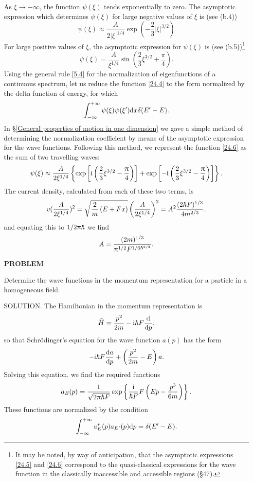 As $ \xi\to-\infty $, the function $ \psi(\xi) $ tends exponentially to zero. The asymptotic expression which determines $ \psi(\xi) $ for large negative values of $\xi$ is (see (b.4))
\begin{equation}\label{24.5}
\psi(\xi)\approx\frac{A}{2|\xi|^{1/4}}\exp\left(-\frac{2}{3}|\xi|^{3/2}\right)
\end{equation}
For large positive values of $\xi$, the asymptotic expression for $ \psi(\xi) $ is (see (b.5))\footnote{It may be noted, by way of anticipation, that the asymptotic expressions \eqref{24.5} and \eqref{24.6} correspond to the quasi-classical expressions for the wave function in the classically inaccessible and accessible regions (\S47).}
\begin{equation}\label{24.6}
\psi(\xi)=\frac{A}{\xi^{1/4}}\sin\left(\frac{2}{3}\xi^{3/2}+\frac{\pi}{4}\right).
\end{equation}
Using the general rule \eqref{5.4} for the normalization of eigenfunctions of a continuous spectrum, let us reduce the function \eqref{24.4} to the form normalized by the delta function of energy, for which
\begin{equation}\label{24.7}
\int_{-\infty}^{+\infty}\psi(\xi)\psi(\xi')\mathrm{d} x\delta(E'-E).
\end{equation}
In \S\ref{General properties of motion in one dimension} we gave a simple method of determining the normalization coefficient by means of the asymptotic expression for the wave functions. Following this method, we represent the function \eqref{24.6} as the sum of two travelling waves:
\[ \psi(\xi)\approx\frac{A}{2\xi^{1/4}}\left\{\exp\left[\mathrm{i}\left(\frac{2}{3}\xi^{3/2}-\frac{\uppi}{4} \right) \right]+\exp\left[-\mathrm{i}\left(\frac{2}{3}\xi^{3/2}-\frac{\uppi}{4} \right) \right] \right\} .\]
The current density, calculated from each of these two terms, is
\[ v(\frac{A}{2\xi^{1/4}})^2=\sqrt{\frac{2}{m}\left(E+Fx \right)}\left(\frac{A}{2\xi^{1/4}} \right)^2=A^2\frac{(2\hbar F)^{1/3}}{4m^{2/3}}. \]
and equating this to $ 1/2\uppi\hbar $ we find
\begin{equation}\label{24.8}
A=\frac{(2m)^{1/3}}{\uppi^{1/2}F^{1/6\hbar^{2/3}}}.
\end{equation}






{\small 
\textbf{PROBLEM}


Determine the wave functions in the momentum representation for a particle in a homogeneous field.





SOLUTION. The Hamiltonian in the momentum representation is
\[ \widehat{H}=\frac{p^2}{2m}-\mathrm{i}\hbar F\frac{\mathrm{d}}{\mathrm{d} p}, \]
so that Schr\"odinger's equation for the wave function $ a (p) $ has the form
\[ -\mathrm{i}\hbar F\frac{\mathrm{d} a}{\mathrm{d} p}+\left(\frac{p^2}{2m}-E \right)a. \]
Solving this equation, we find the required functions
\[ a_E(p)=\frac{1}{\sqrt{2\uppi\hbar F}}\exp\left\{\frac{\mathrm{i}}{\hbar F}F\left(Ep-\frac{p^3}{6m} \right) \right\}. \]
These functions are normalized by the condition
\[ \int_{-\infty}^{+\infty}a^*_E(p)a_{E'}(p)\mathrm{d} p=\delta(E'-E). \]
}
